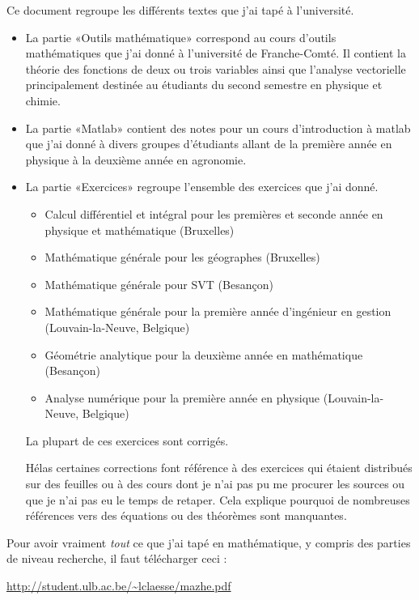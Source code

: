 Ce document regroupe les différents textes que j'ai tapé à l'université.
\begin{itemize}
    \item La partie «Outils mathématique» correspond au cours d'outils mathématiques que j'ai donné à l'université de Franche-Comté. Il contient la théorie des fonctions de deux ou trois variables ainsi que l'analyse vectorielle principalement destinée au étudiants du second semestre en physique et chimie.
    \item La partie «Matlab» contient des notes pour un cours d'introduction à matlab que j'ai donné à divers groupes d'étudiants allant de la première année en physique à la deuxième année en agronomie.

    \item La partie «Exercices» regroupe l'ensemble des exercices que j'ai donné. 

        \begin{itemize}
            \item Calcul différentiel et intégral pour les premières et seconde année en physique et mathématique (Bruxelles)
            \item Mathématique générale pour les géographes (Bruxelles)
            \item Mathématique générale pour SVT (Besançon)
            \item Mathématique générale pour la première année d'ingénieur en gestion (Louvain-la-Neuve, Belgique)
            \item Géométrie analytique pour la deuxième année en mathématique (Besançon)
            \item Analyse numérique pour la première année en physique (Louvain-la-Neuve, Belgique)
        \end{itemize}
        La plupart de ces exercices sont corrigés. 

        Hélas certaines corrections font référence à des exercices qui étaient distribués sur des feuilles ou à des cours dont je n'ai pas pu me procurer les sources ou que je n'ai pas eu le temps de retaper. Cela explique pourquoi de nombreuses références vers des équations ou des théorèmes sont manquantes.
\end{itemize}

\vfill

Pour avoir vraiment \emph{tout} ce que j'ai tapé en mathématique, y compris des parties de niveau recherche, il faut télécharger ceci :
\begin{center}
    \url{http://student.ulb.ac.be/~lclaesse/mazhe.pdf}
\end{center}



\clearpage
